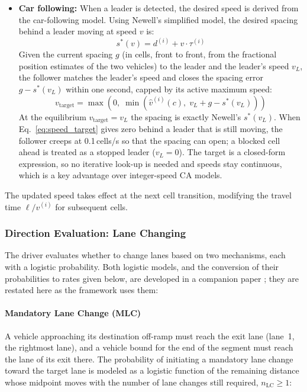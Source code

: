 \documentclass[review,number]{elsarticle}
\begin{document}
\begin{itemize}
    \item \textbf{Car following:} When a leader is detected, the desired speed is derived from the car-following model. Using Newell's simplified model, the desired spacing behind a leader moving at speed $v$ is:
    \begin{equation}
        s^{*}(v) = d^{(i)} + v \cdot \tau^{(i)}
        \label{eq:desired_spacing}
    \end{equation}
    Given the current spacing $g$ (in cells, front to front, from the fractional position estimates of the two vehicles) to the leader and the leader's speed $v_L$, the follower matches the leader's speed and closes the spacing error $g - s^{*}(v_L)$ within one second, capped by its active maximum speed:
    \begin{equation}
        v_{\text{target}} = \max\!\left(0,\; \min\!\left(\hat{v}^{(i)}(c),\; v_L + g - s^{*}(v_L)\right)\right)
        \label{eq:speed_target}
    \end{equation}
    At the equilibrium $v_{\text{target}} = v_L$ the spacing is exactly Newell's $s^{*}(v_L)$. When Eq.~\eqref{eq:speed_target} gives zero behind a leader that is still moving, the follower creeps at 0.1\,cells/s so that the spacing can open; a blocked cell ahead is treated as a stopped leader ($v_L = 0$). The target is a closed-form expression, so no iterative look-up is needed and speeds stay continuous, which is a key advantage over integer-speed CA models.
\end{itemize}

The updated speed takes effect at the next cell transition, modifying the travel time $\ell / v^{(i)}$ for subsequent cells.

\subsubsection{Direction Evaluation: Lane Changing}
\label{sec:lane_changing}

The driver evaluates whether to change lanes based on two mechanisms, each with a logistic probability. Both logistic models, and the conversion of their probabilities to rates given below, are developed in a companion paper \citep{demirtas2026lclogistic}; they are restated here as the framework uses them:

\paragraph{Mandatory Lane Change (MLC)}
A vehicle approaching its destination off-ramp must reach the exit lane (lane~1, the rightmost lane), and a vehicle bound for the end of the segment must reach the lane of its exit there. The probability of initiating a mandatory lane change toward the target lane is modeled as a logistic function of the remaining distance whose midpoint moves with the number of lane changes still required, $n_{\text{LC}} \geq 1$:
\end{document}
